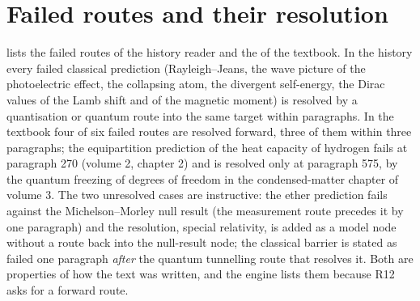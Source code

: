 \documentclass[11pt,a4paper,twoside,openany]{report}
\theoremstyle{plain}
\theoremstyle{definition}
\theoremstyle{remark}
\begin{document}
\section{Failed routes and their resolution}
\begin{table}[htbp]\centering\scriptsize
\caption{Failed routes (Rule R12): the forward resolver is the first non-failed route into the same target at or after the failed route; the last column is the nearest non-failed route before it, usually the measurement the failed prediction is compared with.}\label{tab:failed}
\resizebox{\textwidth}{!}{}
\end{table}
 lists the \NEMFailed{} failed routes of the history reader and the \NUPFailed{} of the textbook. In the history every failed classical prediction (Rayleigh--Jeans, the wave picture of the photoelectric effect, the collapsing atom, the divergent self-energy, the Dirac values of the Lamb shift and of the magnetic moment) is resolved by a quantisation or quantum route into the same target within \NEMFailedMaxDist{} paragraphs. In the textbook four of six failed routes are resolved forward, three of them within three paragraphs; the equipartition prediction of the heat capacity of hydrogen fails at paragraph 270 (volume 2, chapter 2) and is resolved only at paragraph 575, by the quantum freezing of degrees of freedom in the condensed-matter chapter of volume 3. The two unresolved cases are instructive: the ether prediction fails against the Michelson--Morley null result (the measurement route precedes it by one paragraph) and the resolution, special relativity, is added as a model node without a route back into the null-result node; the classical barrier is stated as failed one paragraph \emph{after} the quantum tunnelling route that resolves it. Both are properties of how the text was written, and the engine lists them because R12 asks for a forward route.
\end{document}
